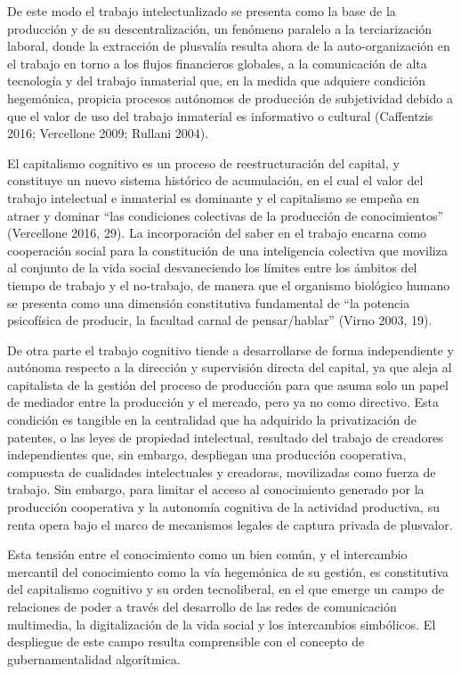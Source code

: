 \documentclass[
]{interact}
\begin{document}
De este modo el trabajo intelectualizado se presenta como la base de la
producción y de su descentralización, un fenómeno paralelo a la
terciarización laboral, donde la extracción de plusvalía resulta ahora
de la auto-organización en el trabajo en torno a los flujos financieros
globales, a la comunicación de alta tecnología y del trabajo inmaterial
que, en la medida que adquiere condición hegemónica, propicia procesos
autónomos de producción de subjetividad debido a que el valor de uso del
trabajo inmaterial es informativo o cultural (Caffentzis 2016;
Vercellone 2009; Rullani 2004).

El capitalismo cognitivo es un proceso de reestructuración del capital,
y constituye un nuevo sistema histórico de acumulación, en el cual el
valor del trabajo intelectual e inmaterial es dominante y el capitalismo
se empeña en atraer y dominar ``las condiciones colectivas de la
producción de conocimientos'' (Vercellone 2016, 29). La incorporación
del saber en el trabajo encarna como cooperación social para la
constitución de una inteligencia colectiva que moviliza al conjunto de
la vida social desvaneciendo los límites entre los ámbitos del tiempo de
trabajo y el no-trabajo, de manera que el organismo biológico humano se
presenta como una dimensión constitutiva fundamental de ``la potencia
psicofísica de producir, la facultad carnal de pensar/hablar'' (Virno
2003, 19).

De otra parte el trabajo cognitivo tiende a desarrollarse de forma
independiente y autónoma respecto a la dirección y supervisión directa
del capital, ya que aleja al capitalista de la gestión del proceso de
producción para que asuma solo un papel de mediador entre la producción
y el mercado, pero ya no como directivo. Esta condición es tangible en
la centralidad que ha adquirido la privatización de patentes, o las
leyes de propiedad intelectual, resultado del trabajo de creadores
independientes que, sin embargo, despliegan una producción cooperativa,
compuesta de cualidades intelectuales y creadoras, movilizadas como
fuerza de trabajo. Sin embargo, para limitar el acceso al conocimiento
generado por la producción cooperativa y la autonomía cognitiva de la
actividad productiva, su renta opera bajo el marco de mecanismos legales
de captura privada de plusvalor.

Esta tensión entre el conocimiento como un bien común, y el intercambio
mercantil del conocimiento como la vía hegemónica de su gestión, es
constitutiva del capitalismo cognitivo y su orden tecnoliberal, en el
que emerge un campo de relaciones de poder a través del desarrollo de
las redes de comunicación multimedia, la digitalización de la vida
social y los intercambios simbólicos. El despliegue de este campo
resulta comprensible con el concepto de gubernamentalidad algorítmica.
\end{document}
